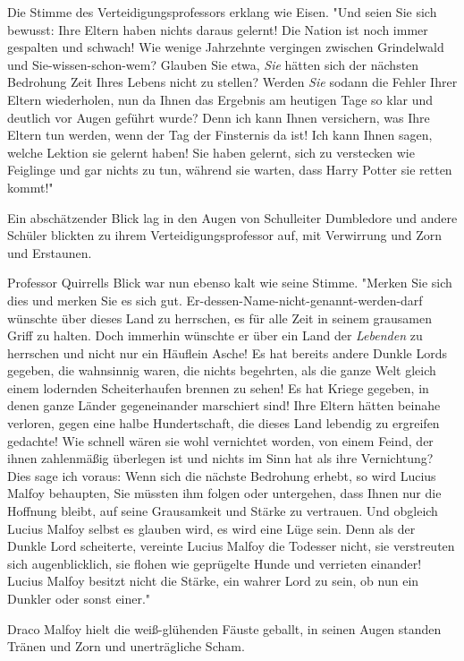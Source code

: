 {Die Stimme des Verteidigungsprofessors erklang wie Eisen. "Und seien Sie sich bewusst: Ihre Eltern haben nichts daraus gelernt! Die Nation ist noch immer gespalten und schwach! Wie wenige Jahrzehnte vergingen zwischen Grindelwald und Sie-wissen-schon-wem? Glauben Sie etwa, \emph{Sie} hätten sich der nächsten Bedrohung Zeit Ihres Lebens nicht zu stellen? Werden \emph{Sie} sodann die Fehler Ihrer Eltern wiederholen, nun da Ihnen das Ergebnis am heutigen Tage so klar und deutlich vor Augen geführt wurde? Denn ich kann Ihnen versichern, was Ihre Eltern tun werden, wenn der Tag der Finsternis da ist! Ich kann Ihnen sagen, welche Lektion sie gelernt haben! Sie haben gelernt, sich zu verstecken wie Feiglinge und gar nichts zu tun, während sie warten, dass Harry Potter sie retten kommt!"

Ein abschätzender Blick lag in den Augen von Schulleiter Dumbledore und andere Schüler blickten zu ihrem Verteidigungsprofessor auf, mit Verwirrung und Zorn und Erstaunen.

Professor Quirrells Blick war nun ebenso kalt wie seine Stimme. "Merken Sie sich dies und merken Sie es sich gut. Er-dessen-Name-nicht-genannt-werden-darf wünschte über dieses Land zu herrschen, es für alle Zeit in seinem grausamen Griff zu halten. Doch immerhin wünschte er über ein Land der \emph{Lebenden} zu herrschen und nicht nur ein Häuflein Asche! Es hat bereits andere Dunkle Lords gegeben, die wahnsinnig waren, die nichts begehrten, als die ganze Welt gleich einem lodernden Scheiterhaufen brennen zu sehen! Es hat Kriege gegeben, in denen ganze Länder gegeneinander marschiert sind! Ihre Eltern hätten beinahe verloren, gegen eine halbe Hundertschaft, die dieses Land lebendig zu ergreifen gedachte! Wie schnell wären sie wohl vernichtet worden, von einem Feind, der ihnen zahlenmäßig überlegen ist und nichts im Sinn hat als ihre Vernichtung? Dies sage ich voraus: Wenn sich die nächste Bedrohung erhebt, so wird Lucius Malfoy behaupten, Sie müssten ihm folgen oder untergehen, dass Ihnen nur die Hoffnung bleibt, auf seine Grausamkeit und Stärke zu vertrauen. Und obgleich Lucius Malfoy selbst es glauben wird, es wird eine Lüge sein. Denn als der Dunkle Lord scheiterte, vereinte Lucius Malfoy die Todesser nicht, sie verstreuten sich augenblicklich, sie flohen wie geprügelte Hunde und verrieten einander! Lucius Malfoy besitzt nicht die Stärke, ein wahrer Lord zu sein, ob nun ein Dunkler oder sonst einer."

Draco Malfoy hielt die weiß-glühenden Fäuste geballt, in seinen Augen standen Tränen und Zorn und unerträgliche Scham.

}
